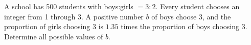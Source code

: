 A school has 500 students with boys:girls $=3:2 $. Every student chooses an integer from 1 through 3. A positive number $ b $ of boys choose 3, and the proportion of girls choosing 3 is $ 1.35 $ times the proportion of boys choosing 3. Determine all possible values of $ b $.
